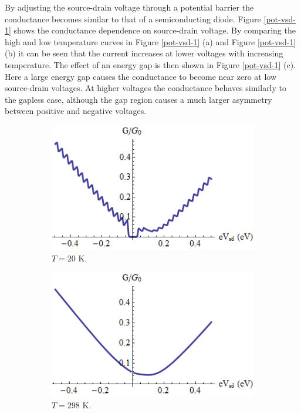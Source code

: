 \documentclass[12pt,a4paper]{report}
\begin{document}
	By adjusting the source-drain voltage through a potential barrier the conductance becomes similar to that of a semiconducting diode. Figure \ref{pot-vsd-1} shows the conductance dependence on source-drain voltage. By comparing the high and low temperature curves in Figure \ref{pot-vsd-1} (a) and Figure \ref{pot-vsd-1} (b) it can be seen that the current increases at lower voltages with increasing temperature. The effect of an energy gap is then shown in Figure \ref{pot-vsd-1} (c). Here a large energy gap causes the conductance to become near zero at low source-drain voltages. At higher voltages the conductance behaves similarly to the gapless case, although the gap region causes a much larger asymmetry between positive and negative voltages.
		\begin{figure}[h]
			 \begin{subfigure}[h]{0.3\textwidth}
				\centerline{\includegraphics[scale=0.35]{images/pot-vsd-1}}
				\caption{$T=20$ K.}
			\end{subfigure}
			\hspace{0.5cm}
			\begin{subfigure}[h]{0.3\textwidth}
				\centerline{\includegraphics[scale=0.35]{images/pot-vsd-2}}
				\caption{$T=298$ K.}
			\end{subfigure}
			\hspace{0.5cm}
			\begin{subfigure}[h]{0.3\textwidth}

\end{subfigure}
\end{figure}
\end{document}
